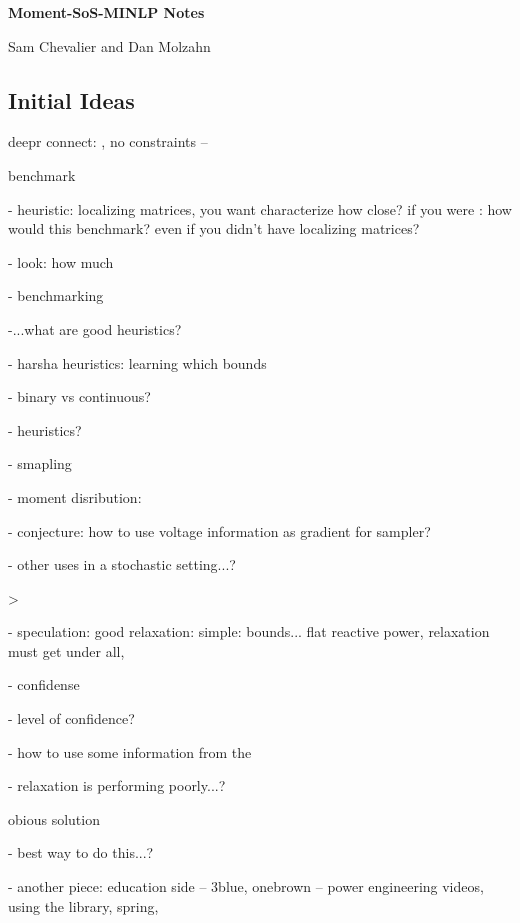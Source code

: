 \documentclass[12pt]{article}
\begin{document}
\pagestyle{plain}

\begin{center}
\large{\bf Moment-SoS-MINLP Notes}
\end{center}
\vspace{-20pt}
\begin{center}
Sam Chevalier and Dan Molzahn
\end{center}

\subsection*{Initial Ideas}

deepr connect: , no constraints – 

benchmark

- heuristic: localizing matrices, you want characterize how close? if you were : how would this benchmark? even if you didn't have localizing matrices?

- look: how much

- benchmarking

-...what are good heuristics?

- harsha heuristics: learning which bounds

- binary vs continuous?

- heuristics? 

- smapling

- moment disribution:

- conjecture: how to use voltage information as gradient for sampler?

- other uses in a stochastic setting...?

>

- speculation: good relaxation: simple: bounds... flat reactive power, relaxation must get under all,

- confidense

- level of confidence?

- how to use some information from the 

- relaxation is performing poorly...?

obious solution

- best way to do this...?

- another piece: education side – 3blue, onebrown – power engineering videos, using the library, spring, 
\end{document}
